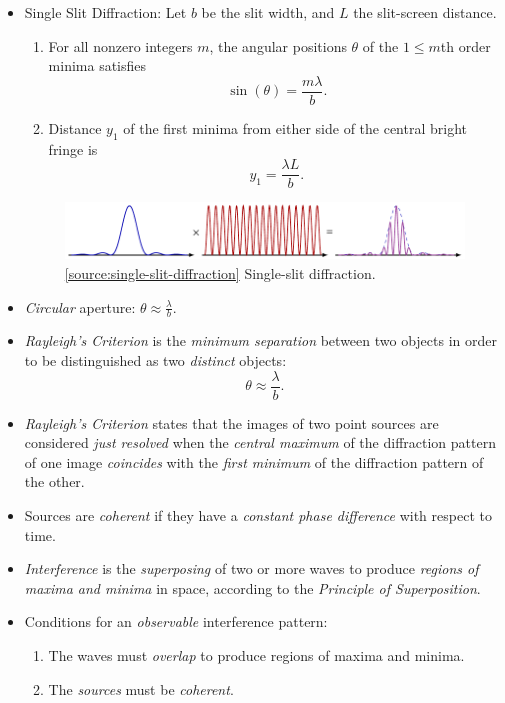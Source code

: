 \documentclass[oneside]{book}
\begin{document}
\begin{itemize}
    \item Single Slit Diffraction: Let \(b\) be the slit width, and \(L\) the slit-screen distance.
    \begin{enumerate}
        \item For all nonzero integers \(m\), the angular positions \(\theta\) of the \(1 \leq m\)th order minima satisfies 
        \[\sin(\theta)=\frac{m\lambda}{b}.\] 
        \item Distance \(y_1\) of the first minima from either side of the central bright fringe is
        \[y_1=\frac{\lambda L}{b}.\]
    \end{enumerate}
    \begin{figure}[H]
        \centering
        \includegraphics[page=2]{../images/single-slit-diffraction/single-slit-diffraction.pdf}
        \caption{\ref{source:single-slit-diffraction} Single-slit diffraction.}
        \label{fig:single-slit-diffraction}
    \end{figure}
    \item \emph{Circular} aperture: \(\theta \approx \frac{\lambda}{b}\).
    \item \emph{Rayleigh's Criterion} is the \emph{minimum separation} between two objects in order to be distinguished as two \emph{distinct} objects:
    \[\theta \approx \frac{\lambda}{b}.\]
    \item \emph{Rayleigh's Criterion} states that the images of two point sources are considered \emph{just resolved} when the \emph{central maximum} of the diffraction pattern of one image \emph{coincides} with the \emph{first minimum} of the diffraction pattern of the other. 
    \item Sources are \emph{coherent} if they have a \emph{constant phase difference} with respect to time.
    \item \emph{Interference} is the \emph{superposing} of two or more waves to produce \emph{regions of maxima and minima} in space, according to the \emph{Principle of Superposition}.
    \item Conditions for an \emph{observable} interference pattern: 
    \begin{enumerate}
        \item The waves must \emph{overlap} to produce regions of maxima and minima.
        \item The \emph{sources} must be \emph{coherent}.

\end{enumerate}
\end{itemize}
\end{document}
